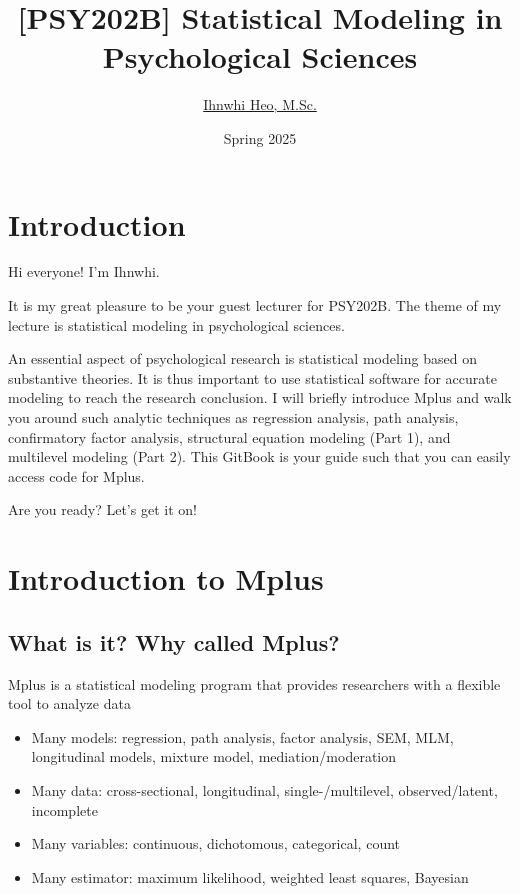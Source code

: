 \documentclass[
]{book}
\title{{[}PSY202B{]} Statistical Modeling in Psychological Sciences}
\author{\href{https://ihnwhiheo.github.io/}{Ihnwhi Heo, M.Sc.}}
\date{Spring 2025}
\begin{document}
\maketitle

{
\setcounter{tocdepth}{1}
\tableofcontents
}
\chapter{Introduction}\label{introduction}

Hi everyone! I'm Ihnwhi.

It is my great pleasure to be your guest lecturer for PSY202B. The theme of my lecture is statistical modeling in psychological sciences.

An essential aspect of psychological research is statistical modeling based on substantive theories. It is thus important to use statistical software for accurate modeling to reach the research conclusion. I will briefly introduce Mplus and walk you around such analytic techniques as regression analysis, path analysis, confirmatory factor analysis, structural equation modeling (Part 1), and multilevel modeling (Part 2). This GitBook is your guide such that you can easily access code for Mplus.

Are you ready? Let's get it on!

\chapter{Introduction to Mplus}\label{introduction-to-mplus}

\section{What is it? Why called Mplus?}\label{what-is-it-why-called-mplus}

Mplus is a statistical modeling program that provides researchers with a flexible tool to analyze data

\begin{itemize}
\item
  Many models: regression, path analysis, factor analysis, SEM, MLM, longitudinal models, mixture model, mediation/moderation
\item
  Many data: cross-sectional, longitudinal, single-/multilevel, observed/latent, incomplete
\item
  Many variables: continuous, dichotomous, categorical, count
\item
  Many estimator: maximum likelihood, weighted least squares, Bayesian
\end{itemize}
\end{document}
